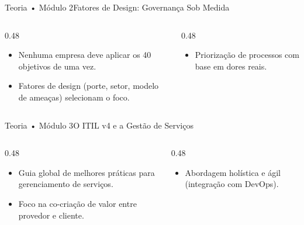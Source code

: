 \begin{senaiframe}{Teoria • Módulo 2}{Fatores de Design: Governança Sob Medida}
  \begin{columns}[t]
    \begin{column}{0.48\textwidth}
      \begin{tcolorbox}[senaibluecard, title={Tailoring (Customização)}]
        \begin{itemize}
          \item Nenhuma empresa deve aplicar os 40 objetivos de uma vez.
          \item Fatores de design (porte, setor, modelo de ameaças) selecionam o foco.
        \end{itemize}
      \end{tcolorbox}
    \end{column}
    \begin{column}{0.48\textwidth}
      \begin{tcolorbox}[senaigreencard, title={Maturidade Proporcional}]
        \begin{itemize}
          \item Priorização de processos com base em dores reais.
        \end{itemize}
      \end{tcolorbox}
    \end{column}
  \end{columns}
\end{senaiframe}

\begin{senaiframe}{Teoria • Módulo 3}{O ITIL v4 e a Gestão de Serviços}
  \begin{columns}[t]
    \begin{column}{0.48\textwidth}
      \begin{tcolorbox}[senaiambercard, title={Foco em Serviços}]
        \begin{itemize}
          \item Guia global de melhores práticas para gerenciamento de serviços.
          \item Foco na co-criação de valor entre provedor e cliente.
        \end{itemize}
      \end{tcolorbox}
    \end{column}
    \begin{column}{0.48\textwidth}
      \begin{tcolorbox}[senaicard, title={Evolução v4}]
        \begin{itemize}
          \item Abordagem holística e ágil (integração com DevOps).
        \end{itemize}
      \end{tcolorbox}
    \end{column}
  \end{columns}
\end{senaiframe}

